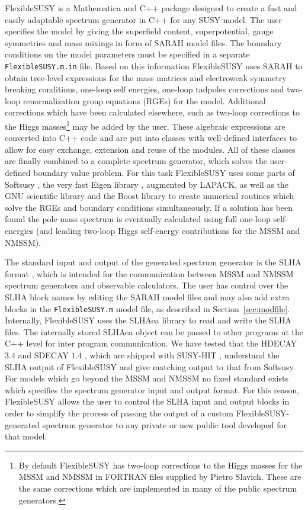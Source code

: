 \documentclass[final,3p,11pt,pdflatex]{elsarticle}
\makeatletter
\newcommand{\sarah}{SARAH\@\xspace}
\newcommand{\fs}{FlexibleSUSY\@\xspace}
\newcommand{\mathematica}{Mathematica\xspace}
\newcommand{\code}[1]{\lstinline|#1|}  %
\newcommand{\secref}[1]{Section~\ref{#1}}
\makeatother
\begin{document}
\fs is a \mathematica and C++ package designed to create a fast and easily
adaptable spectrum generator in C++ for any SUSY model.
The user specifies the model by giving the
superfield content, superpotential, gauge symmetries and mass mixings
in form of \sarah model files.  The boundary conditions on the model
parameters must be specified in a separate \code{FlexibleSUSY.m.in} file.
Based on this information \fs uses \sarah to obtain tree-level
expressions for the mass matrices and electroweak symmetry breaking
conditions, one-loop self energies, one-loop tadpoles corrections and
two-loop renormalization group equations (RGEs) for the model.
Additional corrections which have been calculated elsewhere, such as
two-loop corrections to the Higgs masses\footnote{By default
  \fs has two-loop corrections to the Higgs masses for the
  MSSM
  \cite{Degrassi:2001yf,Brignole:2001jy,Dedes:2002dy,Brignole:2002bz,Dedes:2003km}
  and NMSSM \cite{Degrassi:2009yq} in FORTRAN files supplied by Pietro
  Slavich. These are the same corrections which are implemented in
  many of the public spectrum generators.} may be added by the user.
%
These algebraic expressions are converted into C++ code and are put
into classes with well-defined interfaces to allow for easy exchange,
extension and reuse of the modules.  All of these classes are finally
combined to a complete spectrum generator, which solves the
user-defined boundary value problem.  For this task \fs uses some
parts of Softsusy \cite{Allanach:2001kg}, the very fast Eigen library
\cite{eigen}, augmented by LAPACK, as well as the GNU scientific
library and the Boost library to create numerical routines which solve
the RGEs and boundary conditions simultaneously.  If a solution has
been found the pole mass spectrum is eventually calculated using full
one-loop self-energies (and leading two-loop Higgs self-energy
contributions for the MSSM and NMSSM).

The standard input and output of the generated spectrum generator is
the SLHA format \cite{Skands:2003cj,Allanach:2008qq}, which is
intended for the communication between MSSM and NMSSM spectrum
generators and observable calculators.  The user has control over the
SLHA block names by editing the SARAH model files and may also add
extra blocks in the \code{FlexibleSUSY.m} model file, as described in
\secref{sec:modfile}.
Internally, \fs uses the SLHAea library \cite{slhaea} to read and
write the SLHA files.  The internally stored SLHAea object can be
passed to other programs at the C++ level for inter program
communication.
We have tested that the HDECAY $3.4$ \cite{hdecay} and SDECAY $1.4$
\cite{sdecay}, which are shipped with SUSY-HIT \cite{susyhit},
understand the SLHA output of \fs and give matching output to that
from Softsusy.
%
For models which go beyond the MSSM and NMSSM no fixed standard exists
which specifies the spectrum generator input and output format.  For
this reason, \fs allows the user to control the SLHA input and output
blocks in order to simplify the process of passing the output of a
custom \fs-generated spectrum generator to any private or new public
tool developed for that model.
\end{document}
